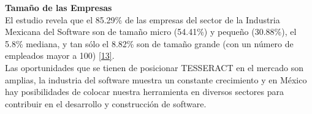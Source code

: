 \textbf{Tamaño de las Empresas}\\

El estudio revela que el 85.29\% de las empresas del sector de la Industria Mexicana del Software son de tamaño micro (54.41\%) y pequeño (30.88\%), el 5.8\% mediana, y tan sólo el 8.82\% son de tamaño grande (con un número de empleados mayor a 100) \hyperlink{b13}{[13]}.\\

Las oportunidades que se tienen de posicionar TESSERACT en el mercado son amplias, la industria del software muestra un constante crecimiento y en México hay posibilidades de colocar nuestra herramienta en diversos sectores para contribuir en el desarrollo y construcción de software. 